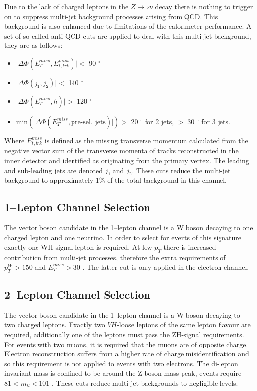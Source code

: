 Due to the lack of charged leptons in the $Z \rightarrow \nu\nu$ decay there is
nothing to trigger on to suppress multi-jet background processes arising from
QCD. This background is also enhanced due to limitations of the calorimeter
performance. A set of so-called anti-QCD cuts are applied to deal with this
multi-jet background, they are as follows:
\begin{itemize}
\item $\lvert \Delta \Phi ( E_T^{miss} , E_{t, trk}^{miss} ) \rvert <$ 90 $^\circ$
\item $\lvert \Delta \Phi ( j_1 , j_2 ) \rvert <$ 140 $^\circ$
\item $\lvert \Delta \Phi ( E_T^{miss} , h ) \rvert >$ 120 $^\circ$
\item $\text{min} ( \lvert \Delta \Phi ( E_T^{miss} , \text{pre-sel. jets}) \rvert ) >$ 20 $^\circ$ for  2 jets, $>$ 30 $^\circ$ for 3 jets.
\end{itemize}
Where $E_{t, trk}^{miss}$ is defined as the missing transverse momentum
calculated from the negative vector sum of the transverse momenta of tracks
reconstructed in the inner detector and identified as originating from the
primary vertex. The leading and sub-leading jets are denoted $j_1$ and $j_2$.
These cuts reduce the multi-jet background to approximately 1\% of the total
background in this channel.


\subsection{1--Lepton Channel Selection}
\label{sec:1lep-selection}

The vector boson candidate in the 1--lepton channel is a W boson decaying to one
charged lepton and one neutrino. In order to select for events of this signature
exactly one WH-signal lepton is required. At low $p_T$ there is increased
contribution from multi-jet processes, therefore the extra requirements of
$p_T^{W} > 150$ \GeV and $E_T^{miss} > 30$ \GeV. The latter cut is only applied in
the electron channel.  

\subsection{2--Lepton Channel Selection}
\label{sec:2lep-selection}

The vector boson candidate in the 1--lepton channel is a W boson decaying to two
charged leptons. Exactly two $VH$-loose leptons of the same lepton flavour are
required, additionally one of the leptons must pass the ZH-signal requirements.
For events with two muons, it is required that the muons are of opposite charge.
Electron reconstruction suffers from a higher rate of charge misidentification
and so this requirement is not applied to events with two electrons. The
di-lepton invariant mass is confined to be around the Z boson mass peak, events
require $81 < m_{ll} < 101$ \GeV. These cuts reduce multi-jet backgrounds to
negligible levels. 

